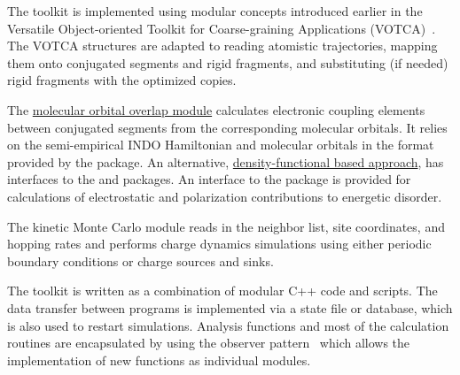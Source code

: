 The toolkit is implemented using modular concepts introduced earlier in the Versatile Object-oriented Toolkit for Coarse-graining Applications (VOTCA)~\cite{ruehle_versatile_2009}. The VOTCA structures are adapted to reading atomistic trajectories, mapping them onto conjugated segments and rigid fragments, and substituting (if needed) rigid fragments with the optimized copies. 

The \hyperref[sec:moo]{molecular orbital overlap module} calculates electronic coupling elements between  conjugated segments from the corresponding molecular orbitals. It relies on the semi-empirical INDO Hamiltonian and molecular orbitals in the format provided by the \gaussian package. An alternative,  \hyperref[sec:dft]{density-functional based approach}, has interfaces to the \gaussian and \turbomole packages. An interface to the \tinker package is provided for calculations of electrostatic and polarization contributions to energetic disorder. 

The kinetic Monte Carlo module reads in the neighbor list, site coordinates, and hopping rates and performs charge dynamics simulations using either periodic boundary conditions or charge sources and sinks. 

The toolkit is written as a combination of modular C++ code and scripts. The data transfer between programs is implemented via a state file or database, which is also used to restart simulations. Analysis functions and most of the calculation routines are encapsulated by using the observer pattern~\cite{gamma_design_1995} which allows the implementation of new functions as individual modules.